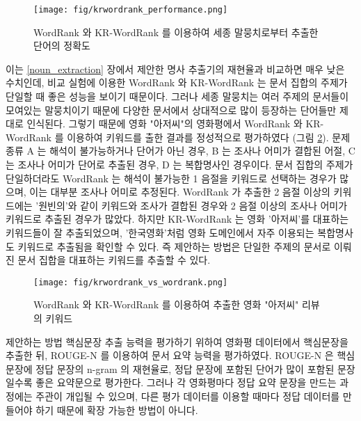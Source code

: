 \documentclass[oneside, ko,phd]{snuthesis_utf8_kor}
\begin{document}
\begin{figure}[H]
\centering
\texttt{[image: fig/krwordrank\_performance.png]}
\caption{WordRank 와 KR-WordRank 를 이용하여 세종 말뭉치로부터 추출한 단어의 정확도}
\label{fig:krwordrank_performance}
\end{figure}

이는 \ref{noun_extraction} 장에서 제안한 명사 추출기의 재현율과 비교하면 매우 낮은 수치인데, 비교 실험에 이용한 WordRank 와 KR-WordRank 는 문서 집합의 주제가 단일할 때 좋은 성능을 보이기 때문이다.
그러나 세종 말뭉치는 여러 주제의 문서들이 모여있는 말뭉치이기 때문에 다양한 문서에서 상대적으로 많이 등장하는 단어들만 제대로 인식된다.
그렇기 때문에 영화 "아저씨"의 영화평에서 WordRank 와 KR-WordRank 를 이용하여 키워드를 출한 결과를 정성적으로 평가하였다 (그림 \ref{fig:krwordrank_vs_wordrank}).
문제 종류 A 는 해석이 불가능하거나 단어가 아닌 경우, B 는 조사나 어미가 결합된 어절, C 는 조사나 어미가 단어로 추출된 경우, D 는 복합명사인 경우이다.
문서 집합의 주제가 단일하더라도 WordRank 는 해석이 불가능한 1 음절을 키워드로 선택하는 경우가 많으며, 이는 대부분 조사나 어미로 추정된다.
WordRank 가 추출한 2 음절 이상의 키워드에는 '원빈의'와 같이 키워드와 조사가 결합된 경우와 2 음절 이상의 조사나 어미가 키워드로 추출된 경우가 많았다.
하지만 KR-WordRank 는 영화 '아저씨'를 대표하는 키워드들이 잘 추출되었으며, '한국영화'처럼 영화 도메인에서 자주 이용되는 복합명사도 키워드로 추출됨을 확인할 수 있다.
즉 제안하는 방법은 단일한 주제의 문서로 이뤄진 문서 집합을 대표하는 키워드를 추출할 수 있다.

\begin{figure}[H]
\centering
\texttt{[image: fig/krwordrank\_vs\_wordrank.png]}
\caption{WordRank 와 KR-WordRank 를 이용하여 추출한 영화 "아저씨" 리뷰의 키워드}
\label{fig:krwordrank_vs_wordrank}
\end{figure}

제안하는 방법 핵심문장 추출 능력을 평가하기 위하여 영화평 데이터에서 핵심문장을 추출한 뒤, ROUGE-N \cite{lin2004rouge} 를 이용하여 문서 요약 능력을 평가하였다.
ROUGE-N 은 핵심문장에 정답 문장의 n-gram 의 재현율로, 정답 문장에 포함된 단어가 많이 포함된 문장일수록 좋은 요약문으로 평가한다.
그러나 각 영화평마다 정답 요약 문장을 만드는 과정에는 주관이 개입될 수 있으며, 다른 평가 데이터를 이용할 때마다 정답 데이터를 만들어야 하기 때문에 확장 가능한 방법이 아니다.
\end{document}
